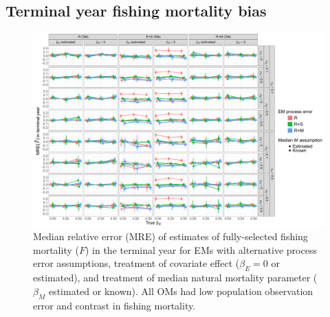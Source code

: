 \documentclass[
  12pt,
]{article}
\begin{document}
\hypertarget{terminal-year-fishing-mortality-bias}{%
\subsection*{Terminal year fishing mortality bias}\label{terminal-year-fishing-mortality-bias}}

\begin{landscape}
\begin{figure}
\begin{center}
\includegraphics[height = \textheight]{terminal_year_F_bias_main}
\end{center}
\caption{Median relative error (MRE) of estimates of fully-selected fishing mortality ($F$) in the terminal year for EMs with alternative process error assumptions, treatment of covariate effect ($\beta_E = 0$ or estimated), and treatment of median natural mortality parameter ($\beta_M$ estimated or known). All OMs had low population observation error and contrast in fishing mortality.}\label{terminal_F_bias}
\end{figure}
\end{landscape}
\end{document}

